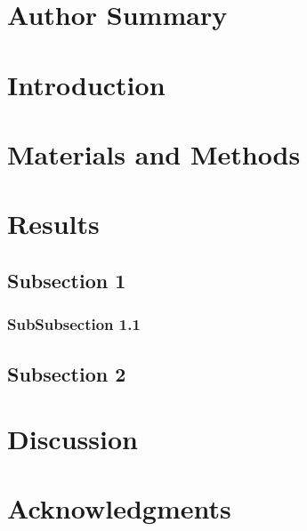 \documentclass[10pt]{article}
\begin{document}
\section*{Author Summary}



\section*{Introduction}
 

\section*{Materials and Methods}

\section*{Results}

\subsection*{Subsection 1}

\subsubsection*{SubSubsection 1.1}

\subsection*{Subsection 2}

\section*{Discussion}




\section*{Acknowledgments}
\end{document}
